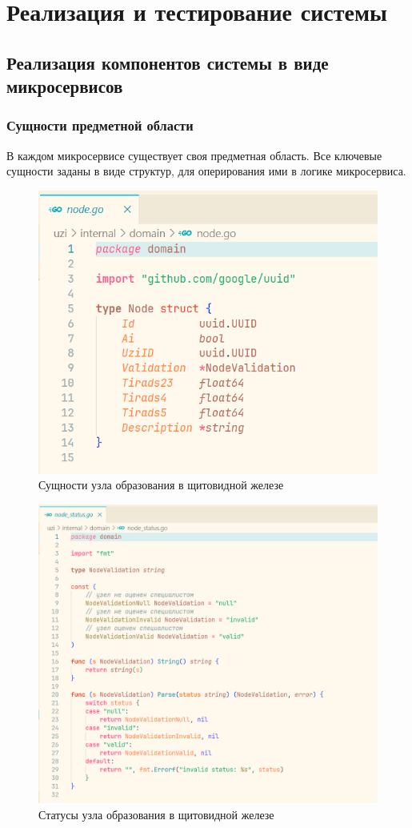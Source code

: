 \chapter{Реализация и тестирование системы}

\section{Реализация компонентов системы в виде микросервисов}

\subsection{Сущности предметной области}
В каждом микросервисе существует своя предметная область. Все ключевые сущности заданы в виде структур, для оперирования
ими в логике микросервиса.

\begin{figure}[H]%
	\begin{center}
		\includegraphics[width=.7\columnwidth]{./img/new/domain_node.png}%
	\end{center}
	\caption{Сущности узла образования в щитовидной железе}%
	\label{pic:domain_node}%
\end{figure}

\begin{figure}[H]%
	\begin{center}
		\includegraphics[width=.7\columnwidth]{./img/new/domain_node_status.png}%
	\end{center}
	\caption{Статусы узла образования в щитовидной железе}%
	\label{pic:domain_node_status}%
\end{figure}


